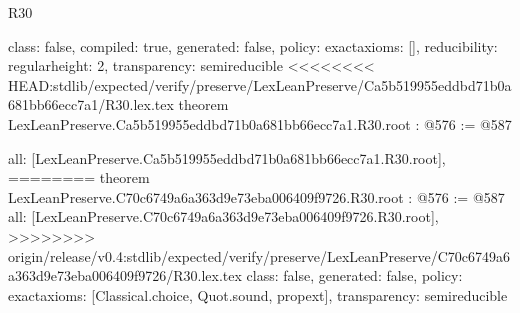 \begin{lexlean}{R30}
\begin{coremodule}
{{{{{  class: false,
  compiled: true,
  generated: false,
  policy: exact{axioms: []},
  reducibility: regular{height: 2},
  transparency: semireducible
}
<<<<<<<< HEAD:stdlib/expected/verify/preserve/LexLeanPreserve/Ca5b519955eddbd71b0a681bb66ecc7a1/R30.lex.tex
theorem LexLeanPreserve.Ca5b519955eddbd71b0a681bb66ecc7a1.R30.root : @576 := @587 {
  all: [LexLeanPreserve.Ca5b519955eddbd71b0a681bb66ecc7a1.R30.root],
========
theorem LexLeanPreserve.C70c6749a6a363d9e73eba006409f9726.R30.root : @576 := @587 {
  all: [LexLeanPreserve.C70c6749a6a363d9e73eba006409f9726.R30.root],
>>>>>>>> origin/release/v0.4:stdlib/expected/verify/preserve/LexLeanPreserve/C70c6749a6a363d9e73eba006409f9726/R30.lex.tex
  class: false,
  generated: false,
  policy: exact{axioms: [Classical.choice, Quot.sound, propext]},
  transparency: semireducible
}

}}}}}
\end{coremodule}
\end{lexlean}
